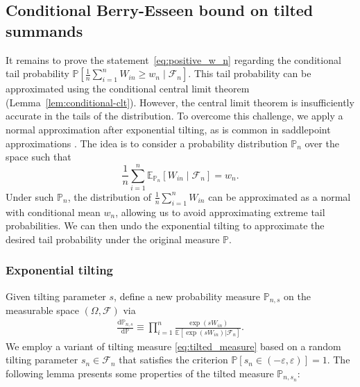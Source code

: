 \documentclass[12pt]{article}
\theoremstyle{definition}
\def\P{\mathbb{P}}
\def\P{\mathbb{P}}
\newcommand{\E}{\mathbb E}								%
\renewcommand{\P}{\mathbb{P}}							%
\begin{document}
\subsection{Conditional Berry-Esseen bound on tilted summands}

It remains to prove the statement~\eqref{eq:positive_w_n} regarding the conditional tail probability $\P\left[\frac1n \sum_{i = 1}^n W_{in} \geq w_n \mid \mathcal F_n\right]$. This tail probability can be approximated using the conditional central limit theorem (Lemma~\ref{lem:conditional-clt}). However, the central limit theorem is insufficiently accurate in the tails of the distribution. To overcome this challenge, we apply a normal approximation after exponential tilting, as is common in saddlepoint approximations \citep{Robinson1982,Reid1988}. The idea is to consider a probability distribution $\P_n$ over the space such that 
\begin{equation}
\frac{1}{n}\sum_{i = 1}^n \E_{\P_n}[W_{in} \mid \mathcal F_n] = w_n.  
\label{eq:tilted-mean}
\end{equation}
Under such $\P_n$, the distribution of $\frac1n \sum_{i = 1}^n W_{in}$ can be approximated as a normal with conditional mean $w_n$, allowing us to avoid approximating extreme tail probabilities. We can then undo the exponential tilting to approximate the desired tail probability under the original measure $\P$.

\subsubsection{Exponential tilting}

Given tilting parameter $s$, define a new probability measure $\P_{n,s}$ on the measurable space $(\Omega, \mathcal F)$ via 
\begin{align}\label{eq:tilted_measure}
    \frac{\mathrm{d}\P_{n,s}}{\mathrm{d}\P}\equiv \prod_{i = 1}^n\frac{\exp(s W_{in})}{\E[\exp(s W_{in})|\mathcal F_n]}.
\end{align}
We employ a variant of tilting measure \eqref{eq:tilted_measure} based on a random tilting parameter $s_n \in \mathcal F_n$ that satisfies the criterion $\P[s_n \in (-\varepsilon, \varepsilon)] = 1$. The following lemma presents some properties of the tilted measure $\P_{n,s_n}$:
\end{document}
